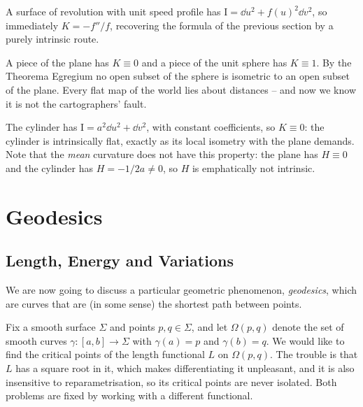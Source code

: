 \begin{example}
    A surface of revolution with unit speed profile has $\mathrm{I} = \dd u^2 + f(u)^2\dd v^2$, so immediately $K = -f''/f$, recovering the formula of the previous section by a purely intrinsic route.
\end{example}

\begin{example}
    A piece of the plane has $K \equiv 0$ and a piece of the unit sphere has $K \equiv 1$. By the Theorema Egregium no open subset of the sphere is isometric to an open subset of the plane. Every flat map of the world lies about distances -- and now we know it is not the cartographers' fault.
\end{example}

\begin{example}
    The cylinder has $\mathrm{I} = a^2 \dd u^2 + \dd v^2$, with constant coefficients, so $K \equiv 0$: the cylinder is intrinsically flat, exactly as its local isometry with the plane demands. Note that the \emph{mean} curvature does not have this property: the plane has $H \equiv 0$ and the cylinder has $H = -1/2a \neq 0$, so $H$ is emphatically not intrinsic.
\end{example}

\section{Geodesics}

\subsection{Length, Energy and Variations}

We are now going to discuss a particular geometric phenomenon, \emph{geodesics}, which are curves that are (in some sense) the shortest path between points.

Fix a smooth surface $\Sigma$ and points $p, q \in \Sigma$, and let $\Omega(p,q)$ denote the set of smooth curves $\gamma: [a,b] \rightarrow \Sigma$ with $\gamma(a) = p$ and $\gamma(b) = q$. We would like to find the critical points of the length functional $L$ on $\Omega(p,q)$. The trouble is that $L$ has a square root in it, which makes differentiating it unpleasant, and it is also insensitive to reparametrisation, so its critical points are never isolated. Both problems are fixed by working with a different functional.

